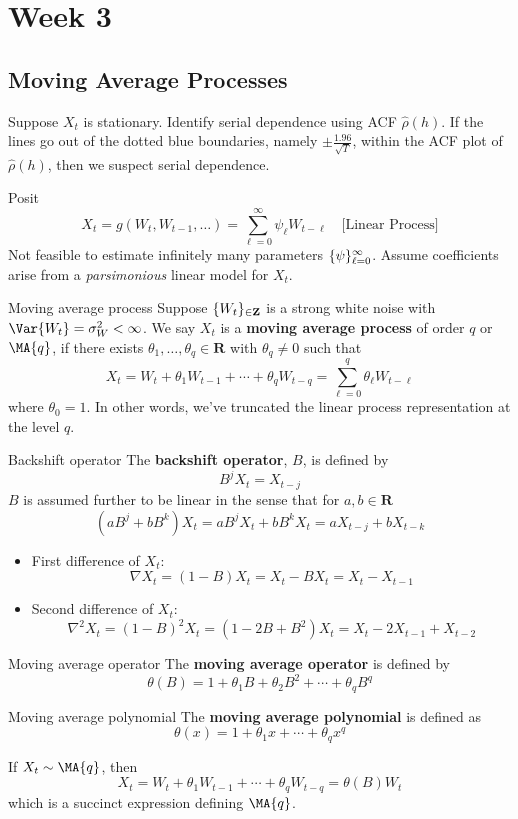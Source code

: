 \chapter{Week 3}
\section{Moving Average Processes}
Suppose $ X_t $ is stationary. Identify serial
dependence using ACF $ \hat{\rho}(h) $.
If the lines go out of the dotted blue boundaries,
namely $ \pm \displaystyle \frac{1.96}{\sqrt{T}} $,
within the ACF plot of $ \hat{\rho}(h) $, then we suspect serial dependence.

Posit
\[ X_t=g(W_t,W_{t-1},\ldots)=\sum_{\ell=0}^{\infty} \psi_\ell W_{t-\ell}\quad
    \text{[Linear Process]} \]
Not feasible to estimate infinitely many parameters
$ \{\psi\}_{\ell=0}^{\infty} $. Assume coefficients
arise from a \emph{parsimonious} linear model for $ X_t $.
\begin{Definition}{Moving average process}{}
    Suppose $ \{W_t\}_{\in\mathbf{Z}} $ is a strong
    white noise with $ \Var{W_t}=\sigma_W^2<\infty $.
    We say $ X_t $ is a \textbf{moving average process}
    of order $ q $ or $ \MA{q} $, if there exists
    $ \theta_1,\ldots,\theta_q\in\mathbf{R} $ with $ \theta_q\ne 0 $
    such that
    \[ X_t=W_t+\theta_1W_{t-1}+\cdots+\theta_q W_{t-q}=\sum_{\ell=0}^{q}
        \theta_\ell W_{t-\ell} \]
    where $ \theta_0=1 $. In other words, we've truncated
    the linear process representation at the level $ q $.
\end{Definition}
\begin{Definition}{Backshift operator}{}
    The \textbf{backshift operator}, $ B $, is defined
    by
    \[ B^j X_t=X_{t-j} \]
    $ B $ is assumed further to be linear in the sense
    that for $ a,b\in\mathbf{R} $
    \[ (a B^j+b B^k)X_t=
        a B^j X_t+b B^k X_t=a X_{t-j}+b X_{t-k} \]
\end{Definition}
\begin{Example}{}{}
    \begin{itemize}
        \item First difference of $ X_t $:
              \[ \nabla X_t=(1-B)X_t=X_t-B X_t=X_t-X_{t-1} \]
        \item Second difference of $ X_t $:
              \[ \nabla^2 X_t=(1-B)^2 X_t=(1-2B+B^2)X_t=X_t-2X_{t-1}+X_{t-2} \]
    \end{itemize}
\end{Example}
\begin{Definition}{Moving average operator}{}
    The \textbf{moving average operator} is defined by
    \[ \theta(B)=1+\theta_1 B+\theta_2 B^2+\cdots+\theta_q B^q \]
\end{Definition}
\begin{Definition}{Moving average polynomial}{}
    The \textbf{moving average polynomial} is defined as
    \[ \theta(x)=1+\theta_1 x+\cdots+\theta_q x^q \]
\end{Definition}
If $ X_t\sim\MA{q} $, then
\[ X_t=W_t+\theta_1W_{t-1}+\cdots+\theta_q W_{t-q}=\theta(B)W_t \]
which is a succinct expression defining $ \MA{q} $.
